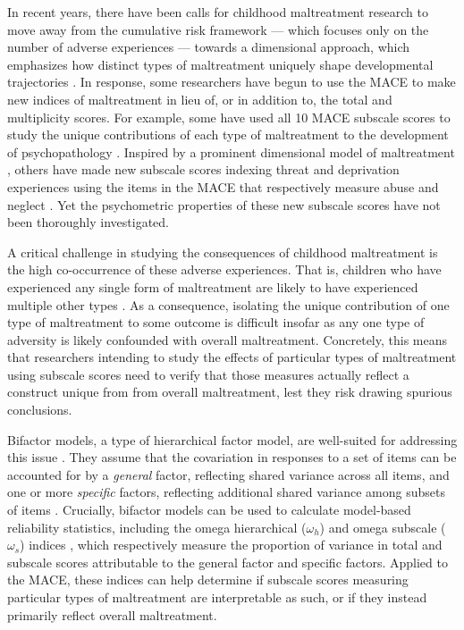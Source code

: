 \documentclass[letterpaper,man,natbib,noextraspace,floatsintext,longtable]{apa6}
\begin{document}
In recent years, there have been calls for childhood maltreatment research to move away from the cumulative risk framework \citep{evans2013cumulative} --- which focuses only on the number of adverse experiences --- towards a dimensional approach, which emphasizes how distinct types of maltreatment uniquely shape developmental trajectories \citep{mclaughlin2016beyond, belsky2012beyond}. In response, some researchers have begun to use the MACE to make new indices of maltreatment in lieu of, or in addition to, the total and multiplicity scores. For example, some have used all 10 MACE subscale scores to study the unique contributions of each type of maltreatment to the development of psychopathology \citep{schalinski2015type, gerke2018childhood, schalinski2019early}. Inspired by a prominent dimensional model of maltreatment \citep{mclaughlin2014childhood}, others have made new subscale scores indexing threat and deprivation experiences using the items in the MACE that respectively measure abuse and neglect \citep{schalinski2018defining, schalinski2019environmental, teicher2018differential}. Yet the psychometric properties of these new subscale scores have not been thoroughly investigated.   

A critical challenge in studying the consequences of childhood maltreatment is the high co-occurrence of these adverse experiences. That is, children who have experienced any single form of maltreatment are likely to have experienced multiple other types \citep{dong2004interrelatedness, herrenkohl2009assessing, kessler2010childhood}. As a consequence, isolating the unique contribution of one type of maltreatment to some outcome is difficult insofar as any one type of adversity is likely confounded with overall maltreatment. Concretely, this means that researchers intending to study the effects of particular types of maltreatment using subscale scores need to verify that those measures actually reflect a construct unique from from overall maltreatment, lest they risk drawing spurious conclusions.

Bifactor models, a type of hierarchical factor model, are well-suited for addressing this issue \citep{bornovalova2020appropriate}. They assume that the covariation in responses to a set of items can be accounted for by a \emph{general} factor, reflecting shared variance across all items, and one or more \emph{specific} factors, reflecting additional shared variance among subsets of items \citep{Reise2012-ql}. Crucially, bifactor models can be used to calculate model-based reliability statistics, including the omega hierarchical ($\omega_h$) and omega subscale ($\omega_s$) indices \citep{reise2013scoring}, which respectively measure the proportion of variance in total and subscale scores attributable to the general factor and specific factors. Applied to the MACE, these indices can help determine if subscale scores measuring particular types of maltreatment are interpretable as such, or if they instead primarily reflect overall maltreatment. 
\end{document}
